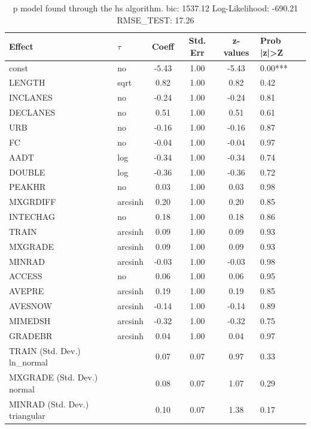 \begin{table}
	\caption{p model found through the hs algorithm. bic: 1537.12 Log-Likelihood: -690.21 RMSE_TEST: 17.26}
	\begin{center}
		\begin{tabular}{|l|l|c|c|c|l|}
			\hline
			Effect & $\tau$ & Coeff & Std. Err & z-values & Prob |z|>Z \\
			\hline
			const & no & -5.43 & 1.00 & -5.43 & 0.00*** \\
			\hline
			LENGTH & sqrt & 0.82 & 1.00 & 0.82 & 0.42 \\
			\hline
			INCLANES & no & -0.24 & 1.00 & -0.24 & 0.81 \\
			\hline
			DECLANES & no & 0.51 & 1.00 & 0.51 & 0.61 \\
			\hline
			URB & no & -0.16 & 1.00 & -0.16 & 0.87 \\
			\hline
			FC & no & -0.04 & 1.00 & -0.04 & 0.97 \\
			\hline
			AADT & log & -0.34 & 1.00 & -0.34 & 0.74 \\
			\hline
			DOUBLE & log & -0.36 & 1.00 & -0.36 & 0.72 \\
			\hline
			PEAKHR & no & 0.03 & 1.00 & 0.03 & 0.98 \\
			\hline
			MXGRDIFF & arcsinh & 0.20 & 1.00 & 0.20 & 0.85 \\
			\hline
			INTECHAG & no & 0.18 & 1.00 & 0.18 & 0.86 \\
			\hline
			TRAIN & arcsinh & 0.09 & 1.00 & 0.09 & 0.93 \\
			\hline
			MXGRADE & arcsinh & 0.09 & 1.00 & 0.09 & 0.93 \\
			\hline
			MINRAD & arcsinh & -0.03 & 1.00 & -0.03 & 0.98 \\
			\hline
			ACCESS & no & 0.06 & 1.00 & 0.06 & 0.95 \\
			\hline
			AVEPRE & arcsinh & 0.19 & 1.00 & 0.19 & 0.85 \\
			\hline
			AVESNOW & arcsinh & -0.14 & 1.00 & -0.14 & 0.89 \\
			\hline
			MIMEDSH & arcsinh & -0.32 & 1.00 & -0.32 & 0.75 \\
			\hline
			GRADEBR & arcsinh & 0.04 & 1.00 & 0.04 & 0.97 \\
			\hline
			TRAIN (Std. Dev.) ln_normal &  & 0.07 & 0.07 & 0.97 & 0.33 \\
			\hline
			MXGRADE (Std. Dev.) normal &  & 0.08 & 0.07 & 1.07 & 0.29 \\
			\hline
			MINRAD (Std. Dev.) triangular &  & 0.10 & 0.07 & 1.38 & 0.17 \\

\end{tabular}
\end{center}
\end{table}
